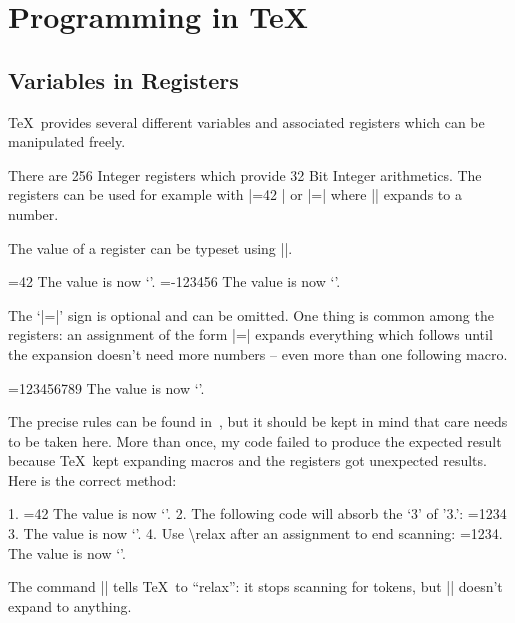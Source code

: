 \section{Programming in \TeX}
\subsection{Variables in Registers}
\TeX\ provides several different variables and associated registers which can be manipulated freely.

\label{sec:variables}
\begin{command}{\count{}}
	There are 256 Integer registers which provide 32 Bit Integer arithmetics. The registers can be used for example with |=42 | or |=\macro | where |\macro| expands to a number.

	The value of a register can be typeset using |\the|.
\begin{codeexample}[]
=42
The value is now `\the{}'. 
\def\macro{-123456}
=\macro 
The value is now `\the{}'.
\end{codeexample}
	
	The `|=|' sign is optional and can be omitted. One thing is common among the registers: an assignment of the form |=|\meta{$\cdots$} expands everything which follows until the expansion doesn't need more numbers -- even more than one following macro.
\begin{codeexample}[]
\def\firstmacro{123}
\def\secondmacro{456}
\def\thirdmacro{789}
=\firstmacro\secondmacro\thirdmacro
The value is now `\the{}'.
\end{codeexample}
 The precise rules can be found in~\cite{texbook}, but it should be kept in mind that care needs to be taken here. More than once, my code failed to produce the expected result because \TeX\ kept expanding macros and the registers got unexpected results. Here is the correct method:
\begin{codeexample}[]
1. =42 %
The value is now `\the{}'.
2. The following code will absorb the `3' of '3.':
\def\macro{1234}
=\macro %
3. The value is now `\the{}'.
4. Use \textbackslash relax after an assignment to end scanning:
=\macro{}. The value is now `\the{}'.
\end{codeexample}
	The command |\relax| tells \TeX\ to ``relax'': it stops scanning for tokens, but |\relax| doesn't expand to anything.
\end{command}

